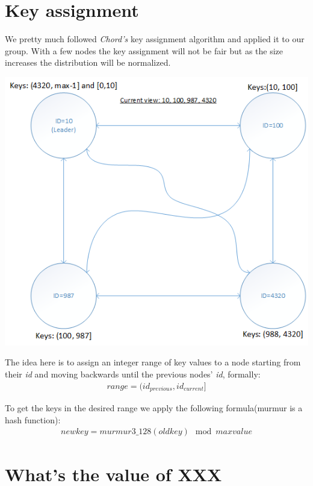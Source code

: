 \documentclass[a4paper, 11pt]{article}
\begin{document}
\clearpage

\section{Key assignment} \label{keys}

\noindent We pretty much followed \textit{Chord's} key assignment\cite{chordy} algorithm and applied it to our group. With a few nodes the key assignment will not be fair but as the size increases the distribution will be normalized.

{\centering\includegraphics[scale = 0.7]{./figures/key-assignment.png}\par}

\noindent The idea here is to assign an integer range of key values to a node starting from their \textit{id} and moving  backwards until the previous nodes' \textit{id}, formally:
\begin{gather*}
range = (id_{previous}, id_{current}]
\end{gather*}

\noindent To get the keys in the desired range we apply the following formula(murmur is a hash function):
\begin{gather*}
newkey = murmur3\_128(oldkey) \mod{maxvalue}
\end{gather*}

\section{What's the value of XXX}
\end{document}
